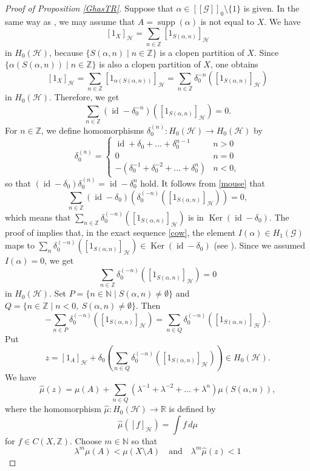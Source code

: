\documentclass[11pt]{article}
\theoremstyle{definition}
\numberwithin{equation}{section}
\newcommand{\id}{\operatorname{id}}
\newcommand{\Ker}{\operatorname{Ker}}
\newcommand{\supp}{\operatorname{supp}}
\newcommand{\G}{\mathcal{G}}
\renewcommand{\H}{\mathcal{H}}
\newcommand{\N}{\mathbb{N}}
\newcommand{\Z}{\mathbb{Z}}
\newcommand{\R}{\mathbb{R}}
\begin{document}
\begin{proof}[Proof of Proposition \ref{GhasTR}]
Suppose that $\alpha\in[[\G]]_0\setminus\{1\}$ is given. 
In the same way as \cite[Lemma 6.10]{M15crelle}, 
we may assume that $A=\supp(\alpha)$ is not equal to $X$. 
We have 
\[
[1_X]_\H=\sum_{n\in\Z}[1_{S(\alpha,n)}]_\H
\]
in $H_0(\H)$, 
because $\{S(\alpha,n)\mid n\in\Z\}$ is a clopen partition of $X$. 
Since $\{\alpha(S(\alpha,n))\mid n\in\Z\}$ is also a clopen partition of $X$, 
one obtains 
\[
[1_X]_\H=\sum_{n\in\Z}[1_{\alpha(S(\alpha,n))}]_\H
=\sum_{n\in\Z}\delta_0^{-n}\left([1_{S(\alpha,n)}]_\H\right)
\]
in $H_0(\H)$. 
Therefore, we get 
\begin{equation}
\sum_{n\in\Z}(\id-\delta_0^{-n})\left([1_{S(\alpha,n)}]_\H\right)=0. 
\label{mouse}
\end{equation}
For $n\in\Z$, we define homomorphisms $\delta_0^{(n)}:H_0(\H)\to H_0(\H)$ by 
\[
\delta_0^{(n)}=\begin{cases}\id+\delta_0+\dots+\delta_0^{n-1}&n>0\\
0&n=0\\
-(\delta_0^{-1}+\delta_0^{-2}+\dots+\delta_0^n)&n<0, \end{cases}
\]
so that $(\id-\delta_0)\delta_0^{(n)}=\id-\delta_0^n$ hold. 
It follows from \eqref{mouse} that 
\[
\sum_{n\in\Z}(\id-\delta_0)
\left(\delta_0^{(-n)}\left([1_{S(\alpha,n)}]_\H\right)\right)=0, 
\]
which means that $\sum_{n\in\Z}\delta_0^{(-n)}([1_{S(\alpha,n)}]_\H)$ 
is in $\Ker(\id-\delta_0)$. 
The proof of \cite[Theorem 4.14]{M12PLMS} implies that, 
in the exact sequence \eqref{cow}, 
the element $I(\alpha)\in H_1(\G)$ maps to 
$\sum_n\delta_0^{(-n)}([1_{S(\alpha,n)}]_\H)\in\Ker(\id-\delta_0)$ 
(see \cite[Lemma 6.8]{M15crelle}). 
Since we assumed $I(\alpha)=0$, we get 
\[
\sum_{n\in\Z}\delta_0^{(-n)}([1_{S(\alpha,n)}]_\H)=0
\]
in $H_0(\H)$. 
Set $P=\{n\in\N\mid S(\alpha,n)\neq\emptyset\}$ and 
$Q=\{n\in\Z\mid n<0,\ S(\alpha,n)\neq\emptyset\}$. 
Then 
\begin{equation}
-\sum_{n\in P}\delta_0^{(-n)}\left([1_{S(\alpha,n)}]_\H\right)=
\sum_{n\in Q}\delta_0^{(-n)}\left([1_{S(\alpha,n)}]_\H\right). 
\label{tiger}
\end{equation}
Put 
\[
z=[1_A]_\H+\delta_0\left(
\sum_{n\in Q}\delta_0^{(-n)}\left([1_{S(\alpha,n)}]_\H\right)\right)
\in H_0(\H). 
\]
We have 
\[
\hat\mu(z)=\mu(A)
+\sum_{n\in Q}(\lambda^{-1}+\lambda^{-2}+\dots+\lambda^n)\mu(S(\alpha,n)), 
\]
where the homomorphism $\hat\mu:H_0(\H)\to\R$ is defined by 
\[
\hat\mu([f]_\H)=\int f\,d\mu
\]
for $f\in C(X,\Z)$. 
Choose $m\in\N$ so that 
\[
\lambda^m\mu(A)
<\mu(X\setminus A)\quad\text{and}\quad \lambda^m\hat\mu(z)<1
\]
\end{proof}
\end{document}
